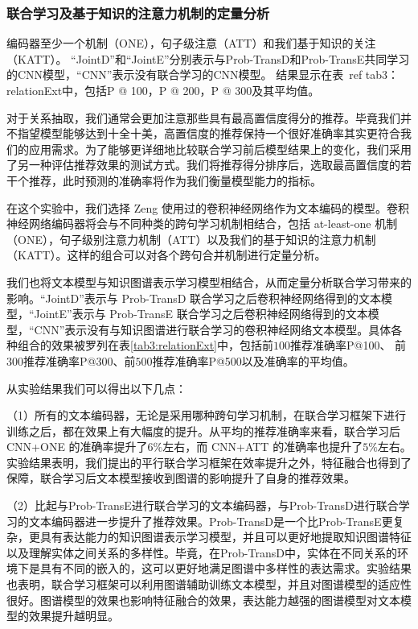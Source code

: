 \subsubsection{联合学习及基于知识的注意力机制的定量分析}

编码器至少一个机制（ONE），句子级注意（ATT）和我们基于知识的关注（KATT）。 “JointD”和“JointE”分别表示与Prob-TransD和Prob-TransE共同学习的CNN模型，“CNN”表示没有联合学习的CNN模型。 结果显示在表\ ref {tab3：relationExt}中，包括P @ 100，P @ 200，P @ 300及其平均值。

对于关系抽取，我们通常会更加注意那些具有最高置信度得分的推荐。毕竟我们并不指望模型能够达到十全十美，高置信度的推荐保持一个很好准确率其实更符合我们的应用需求。为了能够更详细地比较联合学习前后模型结果上的变化，我们采用了另一种评估推荐效果的测试方式。我们将推荐得分排序后，选取最高置信度的若干个推荐，此时预测的准确率将作为我们衡量模型能力的指标。

在这个实验中，我们选择 Zeng \cite{zeng2014relation} 使用过的卷积神经网络作为文本编码的模型。卷积神经网络编码器将会与不同种类的跨句学习机制相结合，包括 at-least-one 机制（ONE），句子级别注意力机制（ATT）以及我们的基于知识的注意力机制（KATT）。这样的组合可以对各个跨句合并机制进行定量分析。

我们也将文本模型与知识图谱表示学习模型相结合，从而定量分析联合学习带来的影响。``JointD''表示与 Prob-TransD 联合学习之后卷积神经网络得到的文本模型，``JointE''表示与 Prob-TransE 联合学习之后卷积神经网络得到的文本模型，``CNN''表示没有与知识图谱进行联合学习的卷积神经网络文本模型。具体各种组合的效果被罗列在表\ref{tab3:relationExt}中，包括前$100$推荐准确率P@100、 前$300$推荐准确率P@300、前$500$推荐准确率P@500以及准确率的平均值。

从实验结果我们可以得出以下几点：

（1）所有的文本编码器，无论是采用哪种跨句学习机制，在联合学习框架下进行训练之后，都在效果上有大幅度的提升。从平均的推荐准确率来看，联合学习后 CNN+ONE 的准确率提升了$6\%$左右，而 CNN+ATT 的准确率也提升了$5\%$左右。实验结果表明，我们提出的平行联合学习框架在效率提升之外，特征融合也得到了保障，联合学习后文本模型接收到图谱的影响提升了自身的推荐效果。


（2）比起与Prob-TransE进行联合学习的文本编码器，与Prob-TransD进行联合学习的文本编码器进一步提升了推荐效果。Prob-TransD是一个比Prob-TransE更复杂，更具有表达能力的知识图谱表示学习模型，并且可以更好地提取知识图谱特征以及理解实体之间关系的多样性。毕竟，在Prob-TransD中，实体在不同关系的环境下是具有不同的嵌入的，这可以更好地满足图谱中多样性的表达需求。实验结果也表明，联合学习框架可以利用图谱辅助训练文本模型，并且对图谱模型的适应性很好。图谱模型的效果也影响特征融合的效果，表达能力越强的图谱模型对文本模型的效果提升越明显。

